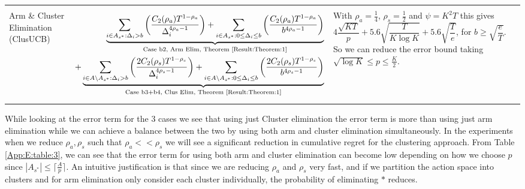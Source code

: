 \begin{table}
\begin{center}
\begin{tabular}{p{1.4cm}p{10.3cm}p{3.5cm}}
\hline\\
Arm \& Cluster Elimination (ClusUCB) 	& \begin{align*}  \underbrace{\sum_{i\in A_{s^{*}}:\Delta_{i} > b}\bigg(\dfrac{C_{2}(\rho_{a})T^{1-\rho_{a}}}{\Delta_{i}^{4\rho_{a}-1}} \bigg)+ \sum_{i\in A_{s^{*}}:0\leq\Delta_{i}\leq b}\bigg(\dfrac{C_{2}(\rho_{a})T^{1-\rho_{a}}}{b^{4\rho_{a} -1}} \bigg)}_{\text{Case b2, Arm Elim, Theorem \ref{Result:Theorem:1}}}\\   
 + \underbrace{\sum_{i\in A\setminus A_{s^*}:\Delta_{i} > b}\bigg(\dfrac{2C_{2}(\rho_{s})T^{1-\rho_{s}}}{\Delta_{i}^{4\rho_{s}-1}} \bigg)+ \sum_{i\in A\setminus A_{s^*}:0\leq\Delta_{i}\leq b}\bigg(\dfrac{2C_{2}(\rho_{s})T^{1-\rho_{s}}}{b^{4\rho_{s} -1}} \bigg)}_{\text{Case b3+b4, Clus Elim, Theorem \ref{Result:Theorem:1}}} \end{align*} & With $\rho_{a}=\frac{1}{4}$, $\rho_{s}=\frac{1}{2}$ and $\psi=K^{2}T$ this gives $4\dfrac{\sqrt{KT}}{p} + 5.6\sqrt{\dfrac{T}{K\log K}} + 5.6\sqrt{\dfrac{T}{e}}$, for $b\geq \sqrt{\dfrac{e}{T}}$. So we can reduce the error bound taking $\sqrt{\log K}\leq p\leq \frac{K}{2}$. 
\end{tabular}
\end{center}	
\end{table}
 
 While looking at the error term for the $3$ cases we see that using just Cluster elimination the error term is more than using just arm elimination while we can achieve a balance between the two by using both arm and cluster  elimination simultaneously. In the experiments when we reduce $\rho_{a}, \rho_{s}$ such that $\rho_{a}<<\rho_{s}$ we will see a significant reduction in cumulative regret for the clustering approach. From Table \ref{App:E:table:3}, we can see that the error term for using both arm and cluster elimination can become low depending on how we choose $p$ since $|A_{s^{*}}|\leq \lceil\frac{A}{p}\rceil$. An intuitive justification is that since we are reducing $\rho_{a}$ and $\rho_{s}$ very fast, and if we partition the action space into clusters and for arm elimination only consider each cluster individually, the probability of eliminating ${*}$ reduces. 

